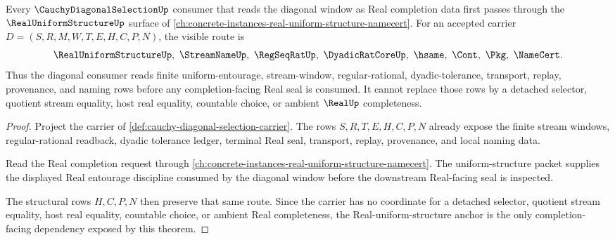 \begin{theorem}
\label{thm:cauchy-diagonal-selection-real-uniform-structure-anchor}
Every $\CauchyDiagonalSelectionUp$ consumer that reads the diagonal window as Real completion data first passes through the $\RealUniformStructureUp$ surface of \autoref{ch:concrete-instances-real-uniform-structure-namecert}. For an accepted carrier $D=(S,R,M,W,T,E,H,C,P,N)$, the visible route is
$$
\RealUniformStructureUp,\ \StreamNameUp,\ \RegSeqRatUp,\ \DyadicRatCoreUp,\ \hsame,\ \Cont,\ \Pkg,\ \NameCert .
$$
Thus the diagonal consumer reads finite uniform-entourage, stream-window, regular-rational, dyadic-tolerance, transport, replay, provenance, and naming rows before any completion-facing Real seal is consumed. It cannot replace those rows by a detached selector, quotient stream equality, host real equality, countable choice, or ambient $\RealUp$ completeness.
\end{theorem}
\begin{proof}
Project the carrier of \autoref{def:cauchy-diagonal-selection-carrier}. The rows $S,R,T,E,H,C,P,N$ already expose the finite stream windows, regular-rational readback, dyadic tolerance ledger, terminal Real seal, transport, replay, provenance, and local naming data.

Read the Real completion request through \autoref{ch:concrete-instances-real-uniform-structure-namecert}. The uniform-structure packet supplies the displayed Real entourage discipline consumed by the diagonal window before the downstream Real-facing seal is inspected.

The structural rows $H,C,P,N$ then preserve that same route. Since the carrier has no coordinate for a detached selector, quotient stream equality, host real equality, countable choice, or ambient Real completeness, the Real-uniform-structure anchor is the only completion-facing dependency exposed by this theorem.
\end{proof}

